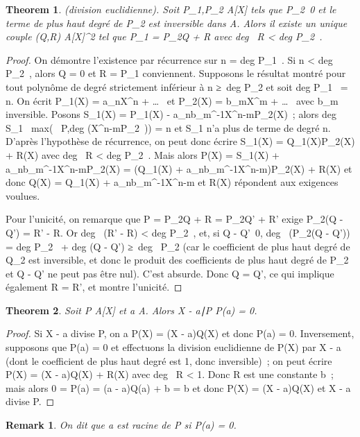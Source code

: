\documentclass{article}
\newtheorem{theorem}{Theorem}[section]
\newenvironment{thm}
  {\begin{theorem}}
  {\end{theorem}}
\newtheorem{remark}{Remark}[section]
\newenvironment{rem}
  {\begin{remark}}
  {\end{remark}}
\begin{document}
\begin{thm}
(division euclidienne). Soit P_1,P_2 \in
A[X] tels que P_2\neq~0 et le terme
de plus haut degré de P_2 est inversible dans A. Alors il
existe un unique couple (Q,R) \in A[X]^2 tel que
P_1 = P_2Q + R avec deg~ R
< deg P_2~.
\end{thm}

\begin{proof}
On démontre l'existence par récurrence sur n
= deg P_1~. Si n
< deg P_2~, alors Q = 0 et R
= P_1 conviennent. Supposons le résultat montré pour tout
polynôme de degré strictement inférieur à n ≥\
deg P_2 et soit deg P_1~ =
n. On écrit P_1(X) = a_nX^n +
\ldots~ et
P_2(X) = b_mX^m +
\ldots~ avec
b_m inversible. Posons S_1(X) = P_1(X) -
a_nb_m^-1X^n-mP_2(X)~;
alors deg S_1~
\leq max(\deg~
P,deg (X^n-mP_2~)) = n et
S_1 n'a plus de terme de degré n. D'après l'hypothèse de
récurrence, on peut donc écrire S_1(X) =
Q_1(X)P_2(X) + R(X) avec deg~
R < deg P_2~. Mais alors
P(X) = S_1(X) +
a_nb_m^-1X^n-mP_2(X) =
(Q_1(X) +
a_nb_m^-1X^n-m)P_2(X) +
R(X) et donc Q(X) = Q_1(X) +
a_nb_m^-1X^n-m et R(X) répondent aux
exigences voulues.

Pour l'unicité, on remarque que P = P_2Q + R = P_2Q' +
R' exige P_2(Q - Q') = R' - R. Or deg~
(R' - R) < deg P_2~, et, si
Q - Q'\neq~0, deg~
(P_2(Q - Q')) = deg P_2~
+ deg (Q - Q') ≥\ deg~
P_2 (car le coefficient de plus haut degré de Q_2 est
inversible, et donc le produit des coefficients de plus haut degré de
P_2 et Q - Q' ne peut pas être nul). C'est absurde. Donc Q =
Q', ce qui implique également R = R', et montre l'unicité.
\end{proof}

\begin{thm}
Soit P \in A[X] et a \in A. Alors X -
a∣P \mathrel\Leftrightarrow P(a) = 0.
\end{thm}

\begin{proof}
Si X - a divise P, on a P(X) = (X - a)Q(X) et donc P(a) =
0. Inversement, supposons que P(a) = 0 et effectuons la division
euclidienne de P(X) par X - a (dont le coefficient de plus haut degré
est 1, donc inversible)~; on peut écrire P(X) = (X - a)Q(X) + R(X) avec
deg~ R < 1. Donc R est une constante
b~; mais alors 0 = P(a) = (a - a)Q(a) + b = b et donc P(X) = (X - a)Q(X)
et X - a divise P.
\end{proof}

\begin{rem}
On dit que a est racine de P si P(a) = 0.
\end{rem}
\end{document}

